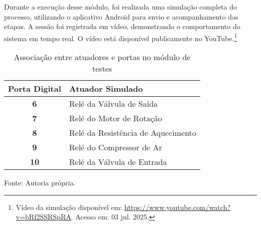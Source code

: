 Durante a execução desse módulo, foi realizada uma simulação completa do processo, utilizando o aplicativo Android para envio e acompanhamento das etapas. A sessão foi registrada em vídeo, demonstrando o comportamento do sistema em tempo real. O vídeo está disponível publicamente no YouTube.\footnote{Vídeo da simulação disponível em: \url{https://www.youtube.com/watch?v=bRf2SSRSpRA}. Acesso em: 03 jul. 2025.}

\begin{table}[H]
    \caption{Associação entre atuadores e portas no módulo de testes}
    \label{tab:atuadores}
    \centering
    \begin{tabular}{>{\bfseries}c p{10cm}}
        \hline
        Porta Digital & Atuador Simulado \\
        \hline
        6  & Relé da Válvula de Saída \\
        7  & Relé do Motor de Rotação \\
        8  & Relé da Resistência de Aquecimento \\
        9  & Relé do Compressor de Ar \\
        10 & Relé da Válvula de Entrada \\
        \hline
    \end{tabular}

    {\centering\footnotesize Fonte: Autoria própria.\par}
\end{table}